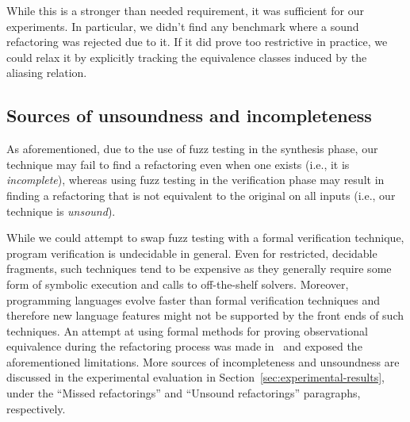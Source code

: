 \documentclass[sigconf,review,anonymous]{acmart}
\begin{document}
While this is a  stronger than needed requirement, it was sufficient for our experiments.
In particular, we didn't find any benchmark where a sound refactoring
was rejected due to it.
If it did prove too restrictive in practice, we could
relax it by explicitly tracking the equivalence classes induced by the aliasing
relation.









\subsection{Sources of unsoundness and incompleteness}\label{sec:incompleteness}
As aforementioned, due to the use of fuzz
testing in the synthesis phase, our technique may fail to find a
refactoring even when one exists (i.e., it is {\em incomplete}),
whereas using fuzz testing in the verification phase may result in
finding a refactoring that is not equivalent to the original on all
inputs (i.e., our technique is {\em unsound}).

While we could attempt to swap fuzz testing with a formal verification technique,
program verification is undecidable in general.
Even for restricted, decidable fragments, such
techniques tend to be expensive as they generally require some form of
symbolic execution and calls to off-the-shelf solvers.  Moreover,
programming languages evolve faster than formal verification techniques and
therefore new language features might not be supported by the front ends of
such techniques. An attempt at using formal methods for proving
observational equivalence during the refactoring process was made in~\cite{DBLP:journals/corr/abs-1712-07388} and exposed the aforementioned limitations.
%
More sources of incompleteness and unsoundness are discussed in the experimental evaluation in Section~\ref{sec:experimental-results},
under the ``Missed refactorings'' and ``Unsound refactorings'' paragraphs, respectively.
\end{document}
